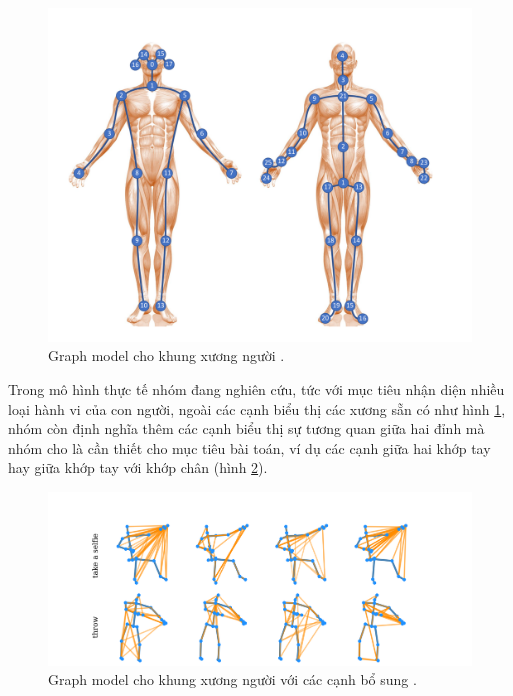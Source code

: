 \begin{figure}[!ht]
    \begin{center}
        \includegraphics[width=\linewidth]{asset/image/skeleton.png}
        \caption{Graph model cho khung xương người \cite{shi2020skeleton}. }
        \label{fig:skeleton}
    \end{center}
\end{figure}

Trong mô hình thực tế nhóm đang nghiên cứu, tức với mục tiêu nhận diện nhiều loại hành vi của con người, ngoài các cạnh biểu thị các xương sẵn có như hình \ref{fig:skeleton}, nhóm còn định nghĩa thêm các cạnh biểu thị sự tương quan giữa hai đỉnh mà nhóm cho là cần thiết cho mục tiêu bài toán, ví dụ các cạnh giữa hai khớp tay hay giữa khớp tay với khớp chân (hình \ref{fig:morebones}).

\begin{figure}[!ht]
    \begin{center}
        \includegraphics[width=\linewidth]{asset/image/morebones.png}
        \caption{Graph model cho khung xương người với các cạnh bổ sung \cite{shi2020skeleton}. }
        \label{fig:morebones}
    \end{center}
\end{figure}

